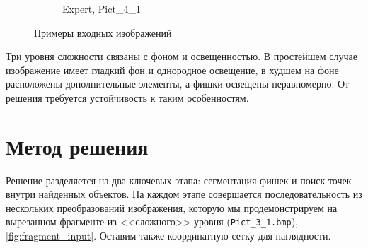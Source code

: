 \documentclass[12pt]{article}
\begin{document}
\begin{figure}[!h]
\begin{subfigure}{.32\linewidth}
    \centering
    \caption{Expert, Pict\_4\_1}
    \label{fig:input_expert}
    \end{subfigure}
    \centering
    \caption{Примеры входных изображений}
    \label{fig:input}
\end{figure}

Три уровня сложности связаны с фоном и освещенностью. В простейшем случае изображение имеет гладкий фон и однородное освещение, в худшем на фоне расположены дополнительные элементы, а фишки освещены неравномерно. От решения требуется устойчивость к таким особенностям.

\section{Метод решения}
Решение разделяется на два ключевых этапа: сегментация фишек и поиск точек внутри найденных объектов. На каждом этапе совершается последовательность из нескольких преобразований изображения, которую мы продемонстрируем на вырезанном фрагменте из <<сложного>> уровня (\verb|Pict_3_1.bmp|), \autoref{fig:fragment_input}. Оставим также координатную сетку для наглядности.
\end{document}
